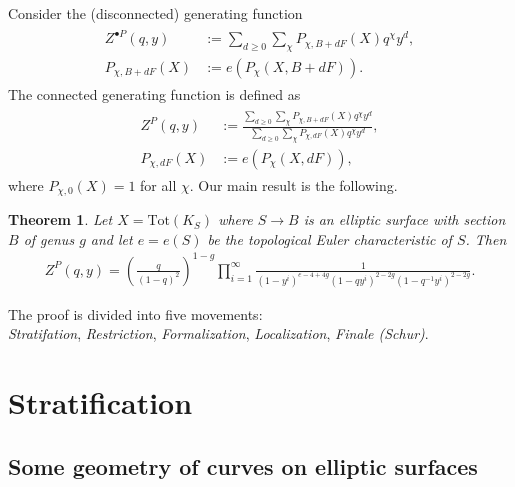 \documentclass[12pt]{amsart}
\newtheorem{theorem}{Theorem}[section]
\theoremstyle{definition}
\theoremstyle{property}
\newcommand\mdot{{\scriptscriptstyle\bullet}}
\renewcommand\_{^{}_}
\begin{document}
Consider the (disconnected) generating function
\begin{align}
\begin{split} \label{discon}
Z^{\mdot P}(q,y) &:= \sum_{d \geq 0} \sum_{\chi} P_{\chi, B+dF}(X) q^{\chi} y^d, \\
P_{\chi, B+dF}(X) &:= e(P_{\chi}(X,B+dF)).
\end{split}
\end{align}
The connected generating function is defined as \cite{Pandharipande-Thomas1}
\begin{align}
\begin{split} \label{con}
Z^{P}(q,y) &:= \frac{\sum_{d \geq 0} \sum_{\chi} P_{\chi,B+dF}(X) q^{\chi} y^d}{\sum_{d \geq 0} \sum_{\chi} P_{\chi,dF}(X) q^{\chi} y^d}, \\
P_{\chi,dF}(X) &:= e(P_{\chi}(X,dF)),
\end{split}
\end{align}
where $P_{\chi,0}(X) = 1$ for all $\chi$. Our main result is the following.
\begin{theorem} \label{mainthm}
Let $X = \mathrm{Tot}(K_S)$ where $S \rightarrow B$ is an elliptic surface with section $B$ of genus $g$ and let $e=e (S)$ be the topological Euler characteristic of $S$. Then
\begin{align*}
Z^{P}(q,y) = \left( \frac{q}{(1-q)^2} \right)^{1-g} \prod_{i=1}^{\infty} \frac{1}{(1-y^i)^{e-4+4g} (1 - q y^i)^{2-2g} (1 - q^{-1} y^i)^{2-2g}}.
\end{align*}
\end{theorem}
The proof is divided into five movements: \\

\noindent \emph{Stratifation}, \emph{Restriction}, \emph{Formalization}, \emph{Localization}, \emph{Finale (Schur)}. \\




\section{Stratification}

\subsection{Some geometry of curves on elliptic surfaces}\label{subsec: geometry of curves on elliptic surfaces}
\end{document}

